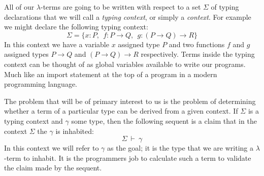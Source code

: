 \documentclass{book}
\begin{document}
    All of our $\lambda$-terms are going to be written with respect to a set $\Sigma$ of typing declarations that we will call a \emph{typing context}, or simply a \emph{context}. For example we might declare the following typing context: $$\Sigma = \{x : P, \ \ f : P \to Q, \ \ g : (P \to Q) \to R\}$$ In this context we have a variable $x$ assigned type $P$ and two functions $f$ and $g$ assigned types $P \to Q$ and $(P \to Q) \to R$ respectively. Terms inside the typing context can be thought of as global variables available to write our programs. Much like an import statement at the top of a program in a modern programming language. 
    
    The problem that will be of primary interest to us is the problem of determining whether a term of a particular type can be derived from a given context. If $\Sigma$ is a typing context and $\gamma$ some type, then the following sequent is a claim that in the context $\Sigma$ the $\gamma$ is inhabited: $$\Sigma \ \vdash \ \gamma $$ In this context we will refer to $\gamma$ as the goal; it is the type that we are writing a $\lambda$-term to inhabit. It is the programmers job to calculate such a term to validate the claim made by the sequent. 
\end{document}
